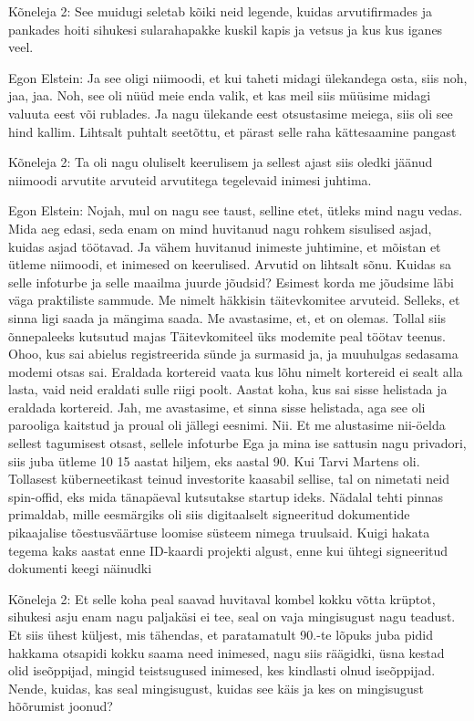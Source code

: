 Kõneleja 2:
See muidugi seletab kõiki neid legende, kuidas arvutifirmades ja pankades hoiti sihukesi sularahapakke kuskil kapis ja vetsus ja kus kus iganes veel.
                 
Egon Elstein:
Ja see oligi niimoodi, et kui taheti midagi ülekandega osta, siis noh, jaa, jaa. Noh, see oli nüüd meie enda valik, et kas meil siis müüsime midagi valuuta eest või rublades. Ja nagu ülekande eest otsustasime meiega, siis oli see hind kallim. Lihtsalt puhtalt seetõttu, et pärast selle raha kättesaamine pangast
                 
Kõneleja 2:
Ta oli nagu oluliselt keerulisem ja sellest ajast siis oledki jäänud niimoodi arvutite arvuteid arvutitega tegelevaid inimesi juhtima.
                 
Egon Elstein:
Nojah, mul on nagu see taust, selline etet, ütleks mind nagu vedas. Mida aeg edasi, seda enam on mind huvitanud nagu rohkem sisulised asjad, kuidas asjad töötavad. Ja vähem huvitanud inimeste juhtimine, et mõistan et ütleme niimoodi, et inimesed on keerulised. Arvutid on lihtsalt sõnu. Kuidas sa selle infoturbe ja selle maailma juurde jõudsid? Esimest korda me jõudsime läbi väga praktiliste sammude. Me nimelt häkkisin täitevkomitee arvuteid.
Selleks, et sinna ligi saada ja mängima saada. Me avastasime, et, et on olemas. Tollal siis õnnepaleeks kutsutud majas
Täitevkomiteel üks modemite peal töötav teenus. Ohoo, kus sai abielus registreerida sünde ja surmasid ja, ja muuhulgas sedasama modemi otsas sai.
Eraldada kortereid vaata kus lõhu nimelt kortereid ei sealt alla lasta, vaid neid eraldati sulle riigi poolt. Aastat koha, kus sai sisse helistada ja eraldada kortereid. Jah, me avastasime, et sinna sisse helistada, aga see oli parooliga kaitstud ja proual oli jällegi eesnimi. Nii.
Et me alustasime nii-öelda sellest tagumisest otsast, sellele infoturbe
Ega ja mina ise sattusin nagu privadori, siis juba ütleme 10 15 aastat hiljem, eks aastal 90. Kui Tarvi Martens oli.
Tollasest küberneetikast teinud investorite kaasabil sellise, tal on nimetati neid spin-offid, eks mida tänapäeval kutsutakse startup ideks. Nädalal tehti pinnas primaldab, mille eesmärgiks oli siis digitaalselt signeeritud dokumentide pikaajalise tõestusväärtuse loomise süsteem nimega truulsaid.
Kuigi hakata tegema kaks aastat enne ID-kaardi projekti algust, enne kui ühtegi signeeritud dokumenti keegi näinudki
                 
Kõneleja 2:
Et selle koha peal saavad huvitaval kombel kokku võtta krüptot, sihukesi asju enam nagu paljakäsi ei tee, seal on vaja mingisugust nagu teadust. Et siis ühest küljest, mis tähendas, et paratamatult 90.-te lõpuks juba pidid hakkama otsapidi kokku saama need inimesed, nagu siis räägidki, üsna kestad olid iseõppijad, mingid teistsugused inimesed, kes kindlasti olnud iseõppijad. Nende, kuidas, kas seal mingisugust, kuidas see käis ja kes on mingisugust hõõrumist joonud?
                 
